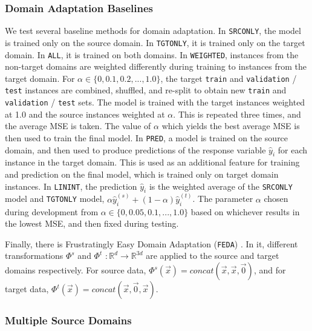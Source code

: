 \documentclass{article}
\begin{document}
\begin{figure}[h]
\end{figure}

\subsubsection{Domain Adaptation Baselines}

We test several baseline methods for domain adaptation. In \texttt{SRCONLY}, the model is trained only on the source domain. In \texttt{TGTONLY}, it is trained only on the target domain. In \texttt{ALL}, it is trained on both domains. In \texttt{WEIGHTED}, instances from the non-target domains are weighted differently during training to instances from the target domain. For \(\alpha \in \{0, 0.1, 0.2, ..., 1.0\} \), the target \texttt{train} and \texttt{validation} / \texttt{test} instances are combined, shuffled, and re-split to obtain new \texttt{train} and \texttt{validation} / \texttt{test} sets. The model is trained with the target instances weighted at 1.0 and the source instances weighted at \(\alpha\). This is repeated three times, and the average MSE is taken. The value of \(\alpha\) which yields the best average MSE is then used to train the final model. In \texttt{PRED}, a model is trained on the source domain, and then used to produce predictions of the response variable \(\hat{y}_i\) for each instance in the target domain. This is used as an additional feature for training and prediction on the final model, which is trained only on target domain instances. In \texttt{LININT}, the prediction \(\hat{y}_i\) is the weighted average of the \texttt{SRCONLY} model and \texttt{TGTONLY} model, \(\alpha \hat{y}_i^{(s)} + (1 - \alpha)\hat{y}_i^{(t)} \). The parameter \(\alpha\) chosen during development from \(\alpha \in \{0, 0.05, 0.1, ..., 1.0\} \) based on whichever results in the lowest MSE, and then fixed during testing.

Finally, there is Frustratingly Easy Domain Adaptation (\texttt{FEDA}) \cite{daume}. In it, different transformations \(\Phi^s\) and \(\Phi^t\) \( : \mathbb{R}^d \rightarrow \mathbb{R}^{3d}\) are applied to the source and target domains respectively. For source data, \(\Phi^s(\vec{x}) = concat(\vec{x}, \vec{x}, \vec{0})\), and for target data, \(\Phi^t(\vec{x}) = concat(\vec{x}, \vec{0}, \vec{x})\). %

\subsubsection{Multiple Source Domains}
\end{document}
